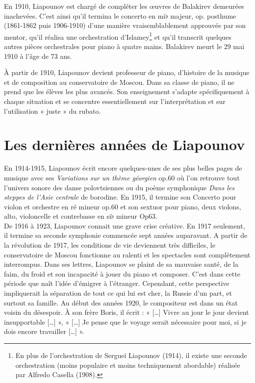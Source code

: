 En 1910, Liapounov est chargé de compléter les œuvres de Balakirev demeurées inachevées. C'est ainsi qu'il termina le concerto en mi$\flat$ majeur, op. posthume (1861-1862 puis 1906-1910) d'une manière vraisemblablement approuvée par son mentor, qu'il réalisa une orchestration d'Islamey\footnote{En plus de l'orchestration de Sergueï Liapounov (1914), il existe une seconde orchestration (moins populaire et moins techniquement abordable) réalisée par Alfredo Casella (1908).} et qu'il transcrit quelques autres pièces orchestrales pour piano à quatre mains. Balakirev meurt le 29 mai 1910 à l'âge de 73 ans.

À partir de 1910, Liapounov devient professeur de piano, d'histoire de la musique et de composition au conservatoire de Moscou. Dans sa classe de piano, il ne prend que les élèves les plus avancés. Son enseignement s'adapte spécifiquement à chaque situation et se concentre essentiellement sur l'interprétation et sur l'utilisation « juste » du rubato.

\section{Les dernières années de Liapounov}

En 1914-1915, Liapounov écrit encore quelques-unes de ses plus belles pages de musique avec ses \emph{Variations sur un thème géorgien} op.60 où l'on retrouve tout l'univers sonore des danse polovtsiennes ou du poème symphonique \emph{Dans les steppes de l'Asie centrale} de borodine. En 1915, il termine son Concerto pour violon et orchestre en ré mineur op.60 et son sextuor pour piano, deux violons, alto, violoncelle et contrebasse en si$\flat$ mineur Op63.\\

De 1916 à 1923, Liapounov connait une grave crise créative. En 1917 seulement, il termine sa seconde symphonie commencée sept années auparavant. A partir de la révolution de 1917, les conditions de vie deviennent très difficiles, le conservatoire de Moscou fonctionne au ralenti et les spectacles sont complètement interrompus. Dans ses lettres, Liapounov se plaint de sa mauvaise santé, de la faim, du froid et son incapacité à jouer du piano et composer. C'est dans cette période que naît l'idée d'émigrer à l'étranger. Cependant, cette perspective impliquerait la séparation de tout ce qui lui est cher, la Russie d'un part, et surtout sa famille. Au début des années 1920, le compositeur est dans un état voisin du désespoir. À son frère Boris, il écrit : « [\dots] Vivre au jour le jour devient insupportable [\dots] », « [\dots] Je pense que le voyage serait nécessaire pour moi, si je dois encore travailler [\dots] ».

